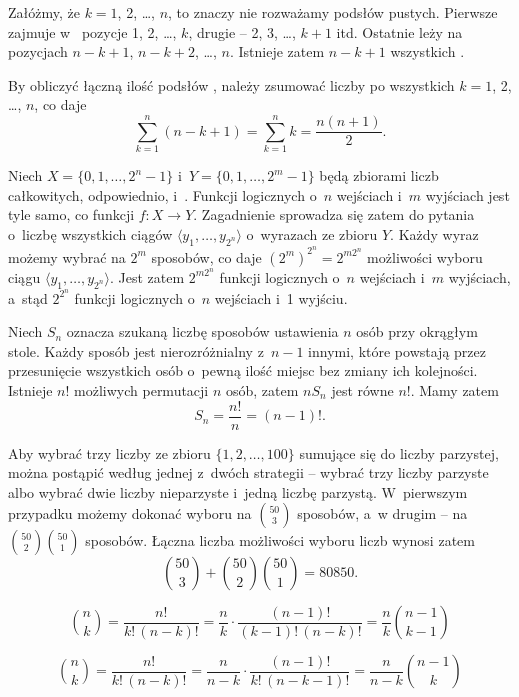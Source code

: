 
\exercise %
Załóżmy, że $k=1$, 2, \dots, $n$, to znaczy nie rozważamy podsłów pustych.
Pierwsze  zajmuje w~ pozycje 1, 2, \dots, $k$, drugie -- 2, 3, \dots, $k+1$ itd.
Ostatnie  leży na pozycjach $n-k+1$, $n-k+2$, \dots, $n$.
Istnieje zatem $n-k+1$ wszystkich  .

By obliczyć łączną ilość podsłów , należy zsumować liczby  po wszystkich $k=1$, 2, \dots, $n$, co daje
\[
	\sum_{k=1}^n(n-k+1) = \sum_{k=1}^nk = \frac{n(n+1)}{2}.
\]

\exercise %
Niech $X=\{0,1,\dots,2^n-1\}$ i~$Y=\{0,1,\dots,2^m-1\}$ będą zbiorami liczb całkowitych, odpowiednio,  i~.
Funkcji logicznych o~$n$ wejściach i~$m$ wyjściach jest tyle samo, co funkcji $f\colon X\to Y$.
Zagadnienie sprowadza się zatem do pytania o~liczbę wszystkich ciągów $\langle y_1,\dots,y_{2^n}\!\rangle$ o~wyrazach ze zbioru $Y$.
Każdy wyraz możemy wybrać na $2^m$ sposobów, co daje $(2^m)^{2^n}=2^{m2^n}\!$ możliwości wyboru ciągu $\langle y_1,\dots,y_{2^n}\!\rangle$.
Jest zatem $2^{m2^n}\!$ funkcji logicznych o~$n$ wejściach i~$m$ wyjściach, a~stąd $2^{2^n}\!$ funkcji logicznych o~$n$ wejściach i~1 wyjściu.

\exercise %
Niech $S_n$ oznacza szukaną liczbę sposobów ustawienia $n$ osób przy okrągłym stole.
Każdy sposób jest nierozróżnialny z~$n-1$ innymi, które powstają przez przesunięcie wszystkich osób o~pewną ilość miejsc bez zmiany ich kolejności.
Istnieje $n!$ możliwych permutacji $n$ osób, zatem $nS_n$ jest równe $n!$.
Mamy zatem
\[
	S_n = \frac{n!}{n} = (n-1)!.
\]

\exercise %
Aby wybrać trzy liczby ze zbioru $\{1,2,\dots,100\}$ sumujące się do liczby parzystej, można postąpić według jednej z~dwóch strategii -- wybrać trzy liczby parzyste albo wybrać dwie liczby nieparzyste i~jedną liczbę parzystą.
W~pierwszym przypadku możemy dokonać wyboru na $\binom{50}{3}$ sposobów, a~w drugim -- na $\binom{50}{2}\binom{50}{1}$ sposobów.
Łączna liczba możliwości wyboru liczb wynosi zatem
\[
	\binom{50}{3}+\binom{50}{2}\binom{50}{1} = 80850.
\]

\exercise %
\[
	\binom{n}{k} = \frac{n!}{k!\,(n-k)!} = \frac{n}{k}\cdot\frac{(n-1)!}{(k-1)!\,(n-k)!} = \frac{n}{k}\binom{n-1}{k-1}
\]

\exercise %
\[
	\binom{n}{k} = \frac{n!}{k!\,(n-k)!} = \frac{n}{n-k}\cdot\frac{(n-1)!}{k!\,(n-k-1)!} = \frac{n}{n-k}\binom{n-1}{k}
\]

